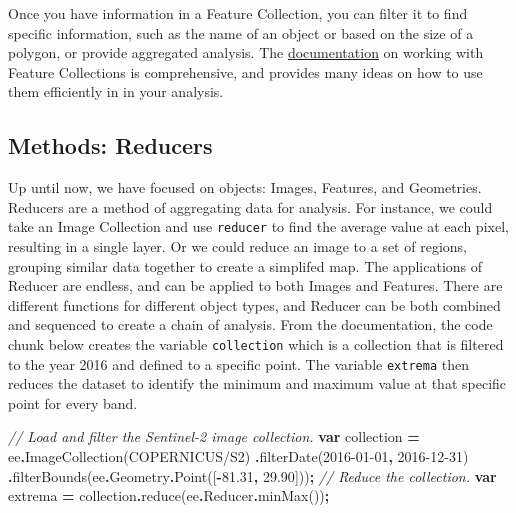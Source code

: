 \documentclass[
]{article}
\newenvironment{Shaded}{\begin{snugshade}}{\end{snugshade}}
\newcommand{\AttributeTok}[1]{\textcolor[rgb]{0.77,0.63,0.00}{#1}}
\newcommand{\CommentTok}[1]{\textcolor[rgb]{0.56,0.35,0.01}{\textit{#1}}}
\newcommand{\FloatTok}[1]{\textcolor[rgb]{0.00,0.00,0.81}{#1}}
\newcommand{\FunctionTok}[1]{\textcolor[rgb]{0.00,0.00,0.00}{#1}}
\newcommand{\KeywordTok}[1]{\textcolor[rgb]{0.13,0.29,0.53}{\textbf{#1}}}
\newcommand{\NormalTok}[1]{#1}
\newcommand{\OperatorTok}[1]{\textcolor[rgb]{0.81,0.36,0.00}{\textbf{#1}}}
\newcommand{\StringTok}[1]{\textcolor[rgb]{0.31,0.60,0.02}{#1}}
\begin{document}
Once you have information in a Feature Collection, you can filter it to find specific information, such as the name of an object or based on the size of a polygon, or provide aggregated analysis. The \href{https://developers.google.com/earth-engine/guides/features}{documentation} on working with Feature Collections is comprehensive, and provides many ideas on how to use them efficiently in in your analysis.

\hypertarget{methods-reducers}{%
\subsection{Methods: Reducers}\label{methods-reducers}}

Up until now, we have focused on objects: Images, Features, and Geometries. Reducers are a method of aggregating data for analysis. For instance, we could take an Image Collection and use \texttt{reducer} to find the average value at each pixel, resulting in a single layer. Or we could reduce an image to a set of regions, grouping similar data together to create a simplifed map. The applications of Reducer are endless, and can be applied to both Images and Features. There are different functions for different object types, and Reducer can be both combined and sequenced to create a chain of analysis. From the documentation, the code chunk below creates the variable \texttt{collection} which is a collection that is filtered to the year 2016 and defined to a specific point. The variable \texttt{extrema} then reduces the dataset to identify the minimum and maximum value at that specific point for every band.

\begin{Shaded}
\begin{Highlighting}[]
\CommentTok{// Load and filter the Sentinel{-}2 image collection.}
\KeywordTok{var}\NormalTok{ collection }\OperatorTok{=}\NormalTok{ ee}\OperatorTok{.}\FunctionTok{ImageCollection}\NormalTok{(}\StringTok{\textquotesingle{}COPERNICUS/S2\textquotesingle{}}\NormalTok{)}
    \OperatorTok{.}\FunctionTok{filterDate}\NormalTok{(}\StringTok{\textquotesingle{}2016{-}01{-}01\textquotesingle{}}\OperatorTok{,} \StringTok{\textquotesingle{}2016{-}12{-}31\textquotesingle{}}\NormalTok{)}
    \OperatorTok{.}\FunctionTok{filterBounds}\NormalTok{(ee}\OperatorTok{.}\AttributeTok{Geometry}\OperatorTok{.}\FunctionTok{Point}\NormalTok{([}\OperatorTok{{-}}\FloatTok{81.31}\OperatorTok{,} \FloatTok{29.90}\NormalTok{]))}\OperatorTok{;}
\CommentTok{// Reduce the collection.}
\KeywordTok{var}\NormalTok{ extrema }\OperatorTok{=}\NormalTok{ collection}\OperatorTok{.}\FunctionTok{reduce}\NormalTok{(ee}\OperatorTok{.}\AttributeTok{Reducer}\OperatorTok{.}\FunctionTok{minMax}\NormalTok{())}\OperatorTok{;}
\end{Highlighting}
\end{Shaded}
\end{document}
